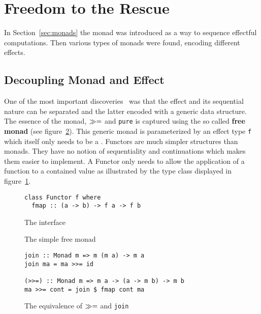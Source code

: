 \section{Freedom to the Rescue}

\label{sec:free}

In Section~\ref{sec:monads} the monad was introduced as a way to
sequence effectful computations. Then various types of monads were
found, encoding different effects.

\subsection{Decoupling Monad and Effect}

\label{sec:introducing-free}

One of the most important discoveries~\cite{data-types-a-la-carte} was that the
effect and its sequential nature can be separated and the latter encoded with a
generic data structure. The essence of the monad, $\gg=$ and \texttt{pure} is
captured using the so called \textbf{free monad} (see
figure~\ref{fig:free-monad}). This generic monad is parameterized by an effect
type \texttt{f} which itself only needs to be a \Functor{}. Functors are much
simpler structures than monads. They have no notion of sequentiality and
continuations which makes them easier to implement. A Functor only needs to
allow the application of a function to a contained value as illustrated by the
type class \Functor{} displayed in figure~\ref{fig:functor-class}.

\begin{figure}
  \begin{lstlisting}
class Functor f where
  fmap :: (a -> b) -> f a -> f b
  \end{lstlisting}
  \caption{The \Functor{} interface}
  \label{fig:functor-class}
\end{figure}
\begin{figure}
  
  \caption{The simple free monad}
  \label{fig:free-monad}
\end{figure}
\begin{figure}
  \begin{lstlisting}
join :: Monad m => m (m a) -> m a
join ma = ma >>= id

(>>=) :: Monad m => m a -> (a -> m b) -> m b
ma >>= cont = join $ fmap cont ma
  \end{lstlisting}
  \caption{The equivalence of $\gg=$ and \texttt{join}}
  \label{fig:join-bind-equivalence}
\end{figure}

